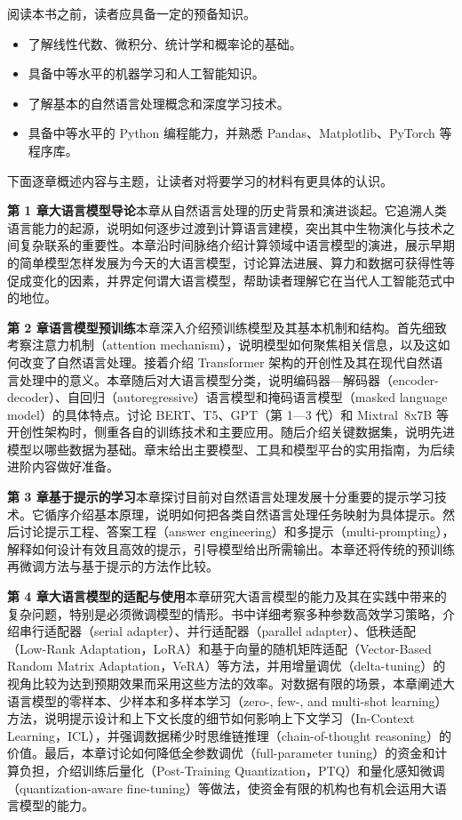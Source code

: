 阅读本书之前，读者应具备一定的预备知识。
\begin{itemize}
\item 了解线性代数、微积分、统计学和概率论的基础。
\item 具备中等水平的机器学习和人工智能知识。
\item 了解基本的自然语言处理概念和深度学习技术。
\item 具备中等水平的 Python 编程能力，并熟悉 Pandas、Matplotlib、PyTorch 等程序库。
\end{itemize}

下面逐章概述内容与主题，让读者对将要学习的材料有更具体的认识。

\noindent\textbf{第 1 章\quad 大语言模型导论}\enspace 本章从自然语言处理的历史背景和演进谈起。它追溯人类语言能力的起源，说明如何逐步过渡到计算语言建模，突出其中生物演化与技术之间复杂联系的重要性。本章沿时间脉络介绍计算领域中语言模型的演进，展示早期的简单模型怎样发展为今天的大语言模型，讨论算法进展、算力和数据可获得性等促成变化的因素，并界定何谓大语言模型，帮助读者理解它在当代人工智能范式中的地位。

\noindent\textbf{第 2 章\quad 语言模型预训练}\enspace 本章深入介绍预训练模型及其基本机制和结构。首先细致考察注意力机制（attention mechanism），说明模型如何聚焦相关信息，以及这如何改变了自然语言处理。接着介绍 Transformer 架构的开创性及其在现代自然语言处理中的意义。本章随后对大语言模型分类，说明编码器—解码器（encoder-decoder）、自回归（autoregressive）语言模型和掩码语言模型（masked language model）的具体特点。讨论 BERT、T5、GPT（第 1—3 代）和 Mixtral~8x7B 等开创性架构时，侧重各自的训练技术和主要应用。随后介绍关键数据集，说明先进模型以哪些数据为基础。章末给出主要模型、工具和模型平台的实用指南，为后续进阶内容做好准备。

\noindent\textbf{第 3 章\quad 基于提示的学习}\enspace 本章探讨目前对自然语言处理发展十分重要的提示学习技术。它循序介绍基本原理，说明如何把各类自然语言处理任务映射为具体提示。然后讨论提示工程、答案工程（answer engineering）和多提示（multi-prompting），解释如何设计有效且高效的提示，引导模型给出所需输出。本章还将传统的预训练再微调方法与基于提示的方法作比较。

\noindent\textbf{第 4 章\quad 大语言模型的适配与使用}\enspace 本章研究大语言模型的能力及其在实践中带来的复杂问题，特别是必须微调模型的情形。书中详细考察多种参数高效学习策略，介绍串行适配器（serial adapter）、并行适配器（parallel adapter）、低秩适配（Low-Rank Adaptation，LoRA）和基于向量的随机矩阵适配（Vector-Based Random Matrix Adaptation，VeRA）等方法，并用增量调优（delta-tuning）的视角比较为达到预期效果而采用这些方法的效率。对数据有限的场景，本章阐述大语言模型的零样本、少样本和多样本学习（zero-, few-, and multi-shot learning）方法，说明提示设计和上下文长度的细节如何影响上下文学习（In-Context Learning，ICL），并强调数据稀少时思维链推理（chain-of-thought reasoning）的价值。最后，本章讨论如何降低全参数调优（full-parameter tuning）的资金和计算负担，介绍训练后量化（Post-Training Quantization，PTQ）和量化感知微调（quantization-aware fine-tuning）等做法，使资金有限的机构也有机会运用大语言模型的能力。

